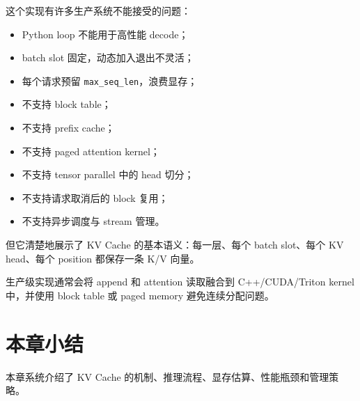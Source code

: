 这个实现有许多生产系统不能接受的问题：

\begin{itemize}
\item Python loop 不能用于高性能 decode；
\item batch slot 固定，动态加入退出不灵活；
\item 每个请求预留 \texttt{max\_seq\_len}，浪费显存；
\item 不支持 block table；
\item 不支持 prefix cache；
\item 不支持 paged attention kernel；
\item 不支持 tensor parallel 中的 head 切分；
\item 不支持请求取消后的 block 复用；
\item 不支持异步调度与 stream 管理。
\end{itemize}

但它清楚地展示了 KV Cache 的基本语义：每一层、每个 batch slot、每个 KV head、每个 position 都保存一条 K/V 向量。

生产级实现通常会将 append 和 attention 读取融合到 C++/CUDA/Triton kernel 中，并使用 block table 或 paged memory 避免连续分配问题。

\section{本章小结}
\label{sec:chapter12-summary}

本章系统介绍了 KV Cache 的机制、推理流程、显存估算、性能瓶颈和管理策略。

